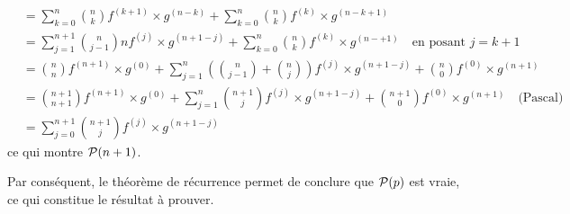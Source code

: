 \documentclass{article}
\renewenvironment{question_kholle}[2][ ]
{
	\subsection{\texorpdfstring{#2}{}}
	\notblank{#1}
	{
		\noindent #1
		\bigbreak
	}
	{}
	\begin{proof}
}
{
	\end{proof}
}
\begin{document}
\begin{question_kholle}
\begin{itemize}[label=$\vartriangleright$]
\begin{itemize}
\begin{align*}
				                                 & = \sum_{k=0}^{n}\binom{n}{k}f^{(k+1)} \times g^{(n-k)}+\sum_{k=0}^{n}\binom{n}{k}f^{(k)} \times g^{(n-k+1)}                                                       \\
				                                 & = \sum_{j=1}^{n+1}\binom{n}{j-1}nf^{(j)} \times g^{(n+1-j)} + \sum_{k=0}^{n}\binom{n}{k}f^{(k)} \times g^{(n-+1)} \quad\text{en posant } j=k+1                    \\
				                                 & = \binom{n}{n}f^{(n+1)} \times g^{(0)} + \sum_{j=1}^{n}\left(\binom{n}{j-1}+\binom{n}{j}\right)f^{(j)} \times g^{(n+1-j)} + \binom{n}{0}f^{(0)} \times g^{(n+1)}  \\
				                                 & = \binom{n+1}{n+1}f^{(n+1)} \times g^{(0)} + \sum_{j=1}^{n}\binom{n+1}{j}f^{(j)} \times g^{(n+1-j)} + \binom{n+1}{0}f^{(0)} \times g^{(n+1)} \quad\text{(Pascal)} \\
				                                 & = \sum_{j=0}^{n+1}\binom{n+1}{j}f^{(j)} \times g^{(n+1-j)}
			            \end{align*}
			            ce qui montre $\mathcal P(n+1)$.
		      \end{itemize}
		      Par conséquent, le théorème de récurrence permet de conclure que $\mathcal P(p)$ est vraie, ce qui constitue le résultat à prouver.
	\end{itemize}

\end{question_kholle}
\end{document}
